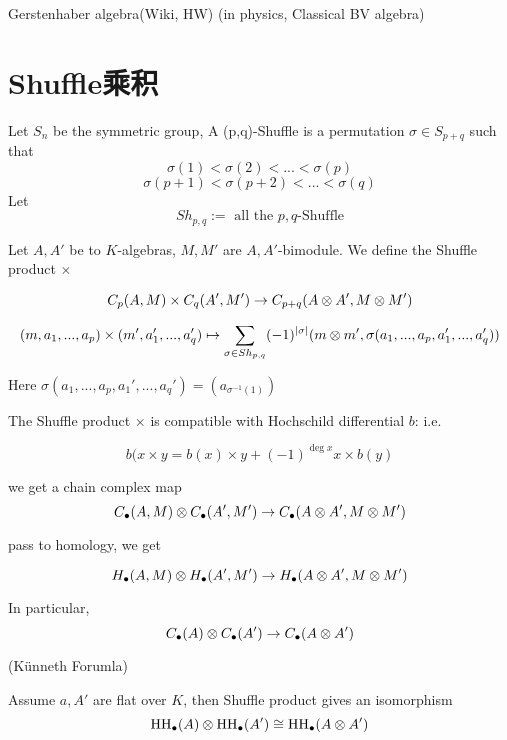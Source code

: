Gerstenhaber algebra(Wiki, HW)
(in physics, Classical BV algebra)


\section{Shuffle乘积}

\begin{definition}
Let $S_n$ be the symmetric group, A (p,q)-Shuffle is
 a permutation $\sigma\in S_{p+q}$ such that
 $$\sigma(1)<\sigma(2)<...<\sigma(p)$$
  $$\sigma(p+1)<\sigma(p+2)<...<\sigma(q)$$
Let
$$Sh_{p,q}:=\text{ all the $p,q$-Shuffle}$$
\end{definition}

Let $A,A'$ be to $K$-algebras,
$M,M'$ are $A,A'$-bimodule. We define the Shuffle product $\times$

$$C_p(A,M)\times C_q(A',M')\to C_{p+q}(A\otimes A',M\otimes M')$$

$$(m,a_1,...,a_p)\times(m',a_1',...,a_q')\mapsto
\sum_{\sigma\in Sh_{p,q}}
  (-1)^{|\sigma|}
  (m\otimes m',\sigma(a_1,...,a_p,a_1',...,a_q'))
$$

Here $\sigma(a_1,...,a_p,a_1',...,a_q')=(a_{\sigma^{-1}(1)})$

\begin{prop}
The Shuffle product $\times$ is compatible with
Hochschild differential $b$: i.e.

$$b(x\times y=b(x)\times y+(-1)^{\deg x}x\times b(y)$$
\end{prop}



\begin{cor}
we get a chain complex map
$$C_{\bullet}(A,M)\otimes C_{\bullet}(A',M')
\to
C_{\bullet}(A\otimes A',M\otimes M')$$

pass to homology, we get

$$H_{\bullet}(A,M)\otimes H_{\bullet}(A',M')
\to
H_{\bullet}(A\otimes A',M\otimes M')$$

In particular,
$$C_{\bullet}(A)\otimes C_{\bullet}(A')\to C_{\bullet}(A\otimes A')$$
\end{cor}

\begin{thm}(K\"{u}nneth Forumla)

Assume $a,A'$ are flat over $K$,
then Shuffle product gives an isomorphism
$$\operatorname{HH}_{\bullet}(A)\otimes\operatorname{HH}_{\bullet}(A')\cong\operatorname{HH}_{\bullet}(A\otimes A')$$
\end{thm}

